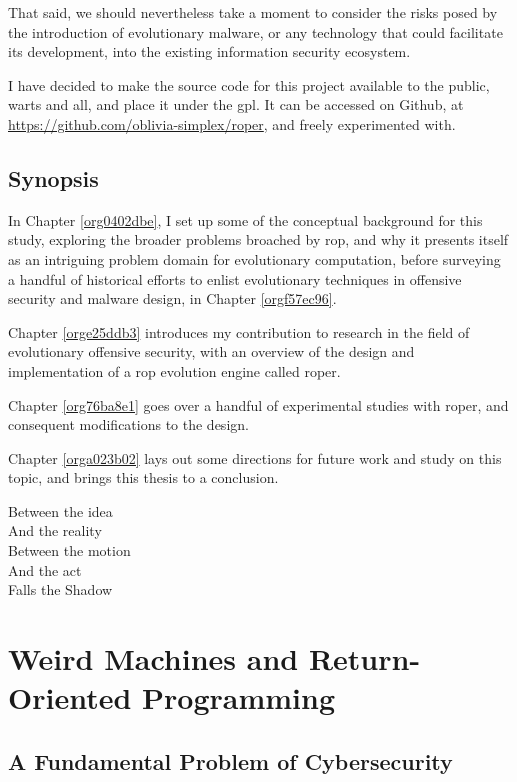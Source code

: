 \documentclass[12pt,glossary]{dalthesis}
\begin{document}
That said, we should nevertheless take a moment to consider the risks posed
by the introduction of evolutionary malware, or any technology that could facilitate
its development, into the existing information security ecosystem.


I have decided to make the source code for this project available to the public,
warts and all, and place it under the \gls{gpl}. It can be accessed on Github,
at \url{https://github.com/oblivia-simplex/roper}, and freely experimented with. 


\section{Synopsis}
\label{sec:org50fab07}
\label{org1617951}

In Chapter \ref{org0402dbe}, I set up some of the conceptual
background for this study, exploring the broader problems broached by \gls{rop}, 
and why it presents itself as an intriguing problem domain for evolutionary
computation, before surveying a handful of historical efforts to
enlist evolutionary techniques in offensive security and malware
design, in Chapter \ref{orgf57ec96}.

Chapter \ref{orge25ddb3} introduces my contribution to research in the field of
evolutionary offensive security, with an overview of the design and implementation of
a \gls{rop} evolution engine called \gls{roper}.

Chapter \ref{org76ba8e1} goes over a handful of experimental studies with
\gls{roper}, and consequent modifications to the design. 

Chapter \ref{orga023b02} lays out some directions for future work and study on this
topic, and brings this thesis to a conclusion.



\begin{savequote}
Between the idea\\  
And the reality\\  
Between the motion\\ 
And the act\\
Falls the Shadow
\end{savequote}
\chapter{Weird Machines and Return-Oriented Programming}
\label{sec:org67091fc}
\label{org0402dbe}
\label{orgbd501cf}
\section{A Fundamental Problem of Cybersecurity}
\label{sec:org15bdb71}
\label{org33cf900}
\end{document}
